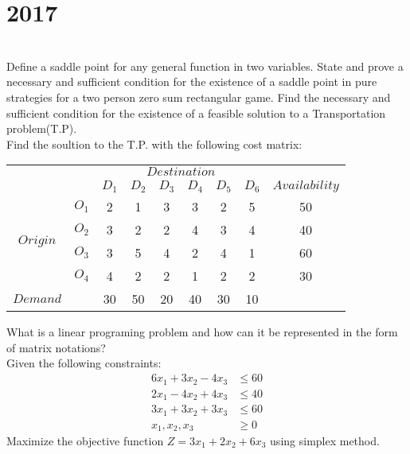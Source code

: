 \section*{2017}
\vspace{-.5cm}
\hrulefill \smallskip\\
 Define a saddle point for any general function in two variables. State and prove a necessary and sufficient condition for the existence of a saddle point in pure strategies for a two person zero sum rectangular game.
\myline
{} Find the necessary and sufficient condition for the existence of a feasible solution  to a Transportation problem(T.P).\\Find the soultion to the T.P. with the following cost matrix:\\
\begin{tabular}{lcccccccc}
& & \multicolumn{6}{c}{$Destination$} & \\
& & $D_1$ & $D_2$ & $D_3$ & $D_4$ & $D_5$ & $D_6$ & $Availability$\\ \cline{3-8}
\multicolumn{1}{c}{\multirow{4}{*}{$Origin$}} &
\multicolumn{1}{c|}{$O_1$} & 2 & 1 & 3 & 3 & 2 & \multicolumn{1}{c|}{5}& 50\\
&\multicolumn{1}{c|}{$O_2$} & 3 & 2 & 2 & 4 & 3 &\multicolumn{1}{c|}{4}& 40\\
&\multicolumn{1}{c|}{$O_3$} & 3 & 5 & 4 & 2 & 4 &\multicolumn{1}{c|}{1}& 60\\
&\multicolumn{1}{c|}{$O_4$} & 4 & 2 & 2 & 1 & 2 &\multicolumn{1}{c|}{2}& 30\\ \cline{3-8}
$Demand$ & & 30 &50 & 20 & 40 & 30 & 10 & 
\end{tabular} 
\myline
{} What is a linear programing problem and how can it be represented in the form of matrix notations?\\ Given the following constraints: \[     \begin{aligned}
         6x_1 + 3x_2 - 4x_3  &\leq 60 \\
         2x_1 - 4x_2 + 4x_3  &\leq 40 \\
         3x_1 + 3x_2 + 3x_3  &\leq 60 \\
         x_1,x_2,x_3&\geq 0
    \end{aligned}\]Maximize the objective function $Z=3x_1+2x_2+6x_3$ using simplex method.

